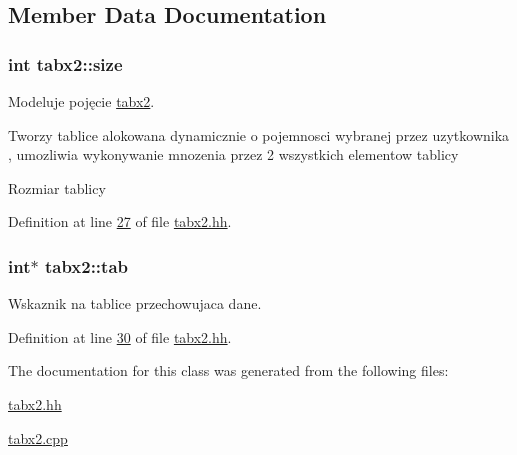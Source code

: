 \subsection{Member Data Documentation}
\hypertarget{classtabx2_a9a6db4f12091baed13f8bad9b9538766}{}
\subsubsection[{size}]{\setlength{\rightskip}{0pt plus 5cm}int tabx2\+::size\hspace{0.3cm}{\ttfamily [private]}}\label{classtabx2_a9a6db4f12091baed13f8bad9b9538766}


Modeluje pojęcie \hyperlink{classtabx2}{tabx2}. 

Tworzy tablice alokowana dynamicznie o pojemnosci wybranej przez uzytkownika , umozliwia wykonywanie mnozenia przez 2 wszystkich elementow tablicy

Rozmiar tablicy 

Definition at line \hyperlink{tabx2_8hh_source_l00027}{27} of file \hyperlink{tabx2_8hh_source}{tabx2.\+hh}.

\hypertarget{classtabx2_ae3ee40d58c1d3dc6a80c34ca63d337e9}{}
\subsubsection[{tab}]{\setlength{\rightskip}{0pt plus 5cm}int$\ast$ tabx2\+::tab\hspace{0.3cm}{\ttfamily [private]}}\label{classtabx2_ae3ee40d58c1d3dc6a80c34ca63d337e9}


Wskaznik na tablice przechowujaca dane. 



Definition at line \hyperlink{tabx2_8hh_source_l00030}{30} of file \hyperlink{tabx2_8hh_source}{tabx2.\+hh}.



The documentation for this class was generated from the following files\+:\begin{DoxyCompactItemize}
\item 
\hyperlink{tabx2_8hh}{tabx2.\+hh}\item 
\hyperlink{tabx2_8cpp}{tabx2.\+cpp}\end{DoxyCompactItemize}
